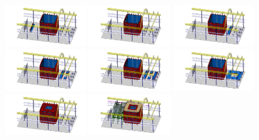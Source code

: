 \begin{figure}[!t]
\includegraphics[width=0.32\textwidth]{./Figures/assembly_sequence_11_07/36.png}
\includegraphics[width=0.32\textwidth]{./Figures/assembly_sequence_11_07/37.png}
\includegraphics[width=0.32\textwidth]{./Figures/assembly_sequence_11_07/38.png}
\includegraphics[width=0.32\textwidth]{./Figures/assembly_sequence_11_07/39.png}
\includegraphics[width=0.32\textwidth]{./Figures/assembly_sequence_11_07/40.png}
\includegraphics[width=0.32\textwidth]{./Figures/assembly_sequence_11_07/41.png}
\includegraphics[width=0.32\textwidth]{./Figures/assembly_sequence_11_07/42.png}
\includegraphics[width=0.32\textwidth]{./Figures/assembly_sequence_11_07/43.png}

\end{figure}
